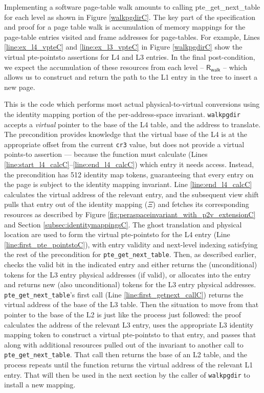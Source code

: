 Implementing a software page-table walk amounts to calling \textsf{pte\_get\_next\_table} for each level as shown in Figure \ref{walkpgdirC}. 
The key part of the specification and proof for a page table walk is accumulation of memory mappings for the page-table entries 
visited and frame addresses for page-tables. 
For example, Lines \ref{line:ex_l4_vpteC} and \ref{line:ex_l3_vpteC} in Figure \ref{walkpgdirC} show the virtual pte-pointsto assertions for L4 and L3 entries.
In the final post-condition, we expect the accumulation of these resources from each level -- $\textsf{R}_{\textsf{walk}}$ -- 
which allows us to construct and return the path to the L1 entry in the tree to insert a new page.  

This is the code which performs most actual physical-to-virtual conversions using the identity mapping portion of the per-address-space invariant.
\lstinline|walkpgdir| accepts a \emph{virtual} pointer to the base of the L4 table, and the address to translate.
The precondition provides knowledge that the virtual base of the L4 is at the appropriate offset from the current \lstinline|cr3| value,
but does not provide a virtual points-to assertion --- because the function must calculate (Lines \ref{line:start_l4_calcC}--\ref{line:end_l4_calcC})
which entry it needs access.
Instead, the precondition has 512 identity map tokens, guaranteeing that every entry on the page is subject to the identity mapping invariant.
Line \ref{line:end_l4_calcC} calculates the virtual address of the relevant entry, and the subsequent view shift
pulls that entry out of the identity mapping ($\Xi$) and fetches its corresponding resources as
described by Figure \ref{fig:peraspaceinvariant_with_p2v_extensionC} and Section \ref{subsec:identitymappingsC}.
The ghost translation and physical location are used to form the virtual pte-pointsto for the L4 entry
(Line \ref{line:first_pte_pointstoC}), with entry validity and next-level indexing
satisfying the rest of the precondition for \lstinline|pte_get_next_table|.
Then, as described earlier, checks the valid bit in the indicated
entry and either returns the (unconditional) tokens for the L3 entry physical addresses (if valid), or
allocates into the entry and returns new (also unconditional) tokens for the L3 entry physical addresses.
\lstinline|pte_get_next_table|'s first call (Line \ref{line:first_getnext_callC}) returns
the virtual address of the base of the L3 table. Then the situation to move from that pointer to the base of the L2
is just like the process just followed: the proof calculates the address of the relevant
L3 entry, uses the appropriate L3 identity mapping token to construct a virtual pte-pointsto to that entry,
and passes that along with additional resources pulled out of the invariant to another call to
\lstinline|pte_get_next_table|. That call then returns the base of an L2 table, and the process
repeats until the function returns the virtual address of the relevant L1 entry.
That will then be used in the next section by the caller of \lstinline|walkpgdir|
to install a new mapping.


